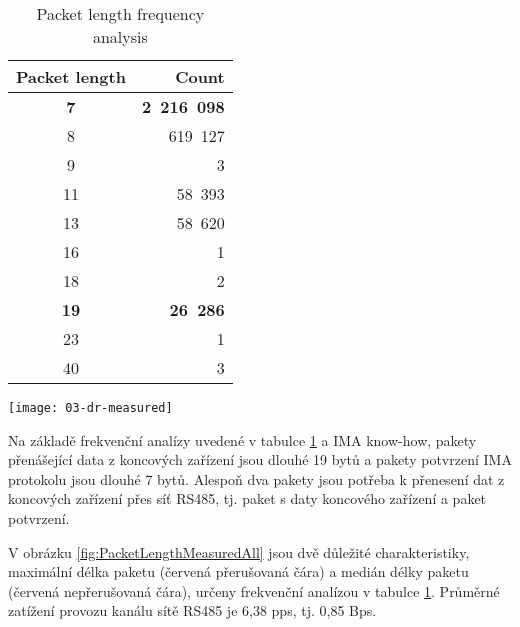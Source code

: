 \begin{table}[h]
\centering
\footnotesize
\caption{Packet length frequency analysis}
\begin{tabular}{cr}
Packet length &  Count \\ \hline
\textbf{7}  &  \textbf{2~216~098}  \\
8  &   619~127   \\
9  &         3   \\
11 &    58~393   \\
13 &    58~620   \\
16 &         1   \\
18 &         2   \\
\textbf{19} &    \textbf{26~286}   \\
23 &         1   \\
40 &         3   \\
\end{tabular}
\label{tab:FreqAnalysis}
\end{table}

\begin{figure*}[ht]
    \centering
    \texttt{[image: 03-dr-measured]}
    \caption{Measured data rate in [bps] in RS485 network during long-term operation test}
    \label{fig:PacketLengthMeasuredAll}
\end{figure*}

Na základě frekvenční analízy uvedené v tabulce \ref{tab:FreqAnalysis} a IMA know-how, pakety přenášející data z koncových zařízení jsou dlouhé 19 bytů a pakety potvrzení IMA protokolu jsou dlouhé 7 bytů. Alespoň dva pakety jsou potřeba k přenesení dat z koncových zařízení přes síť RS485, tj. paket s daty koncového zařízení a paket potvrzení.





V obrázku \ref{fig:PacketLengthMeasuredAll} jsou dvě důležité charakteristiky, maximální délka paketu 
(červená přerušovaná čára) a medián délky paketu (červená nepřerušovaná čára), určeny frekvenční analízou v tabulce \ref{tab:FreqAnalysis}. 
Průměrné zatížení provozu kanálu sítě RS485 je 6,38 pps, tj. 0,85 Bps.










